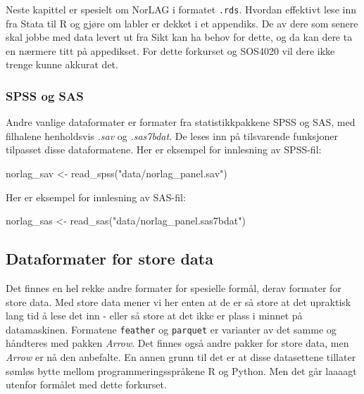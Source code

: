 \documentclass[
  letterpaper,
  DIV=11,
  numbers=noendperiod]{scrreprt}
\newenvironment{Shaded}{\begin{snugshade}}{\end{snugshade}}
\newcommand{\FunctionTok}[1]{\textcolor[rgb]{0.28,0.35,0.67}{#1}}
\newcommand{\NormalTok}[1]{\textcolor[rgb]{0.00,0.23,0.31}{#1}}
\newcommand{\OtherTok}[1]{\textcolor[rgb]{0.00,0.23,0.31}{#1}}
\newcommand{\StringTok}[1]{\textcolor[rgb]{0.13,0.47,0.30}{#1}}
\theoremstyle{definition}
\theoremstyle{remark}
\begin{document}
Neste kapittel er spesielt om NorLAG i formatet \texttt{.rds}. Hvordan
effektivt lese inn fra Stata til R og gjøre om labler er dekket i et
appendiks. De av dere som senere skal jobbe med data levert ut fra Sikt
kan ha behov for dette, og da kan dere ta en nærmere titt på appedikset.
For dette forkurset og SOS4020 vil dere ikke trenge kunne akkurat det.

\hypertarget{spss-og-sas}{%
\subsubsection{SPSS og SAS}\label{spss-og-sas}}

Andre vanlige dataformater er formater fra statistikkpakkene SPSS og
SAS, med filhalene henholdsvis \emph{.sav} og \emph{.sas7bdat}. De leses
inn på tilsvarende funksjoner tilpasset disse dataformatene. Her er
eksempel for innlesning av SPSS-fil:

\begin{Shaded}
\begin{Highlighting}[]
\NormalTok{norlag\_sav }\OtherTok{\textless{}{-}} \FunctionTok{read\_spss}\NormalTok{(}\StringTok{"data/norlag\_panel.sav"}\NormalTok{)}
\end{Highlighting}
\end{Shaded}

Her er eksempel for innlesning av SAS-fil:

\begin{Shaded}
\begin{Highlighting}[]
\NormalTok{norlag\_sas }\OtherTok{\textless{}{-}} \FunctionTok{read\_sas}\NormalTok{(}\StringTok{"data/norlag\_panel.sas7bdat"}\NormalTok{)}
\end{Highlighting}
\end{Shaded}

\hypertarget{dataformater-for-store-data}{%
\subsection{Dataformater for store
data}\label{dataformater-for-store-data}}

Det finnes en hel rekke andre formater for spesielle formål, derav
formater for store data. Med store data mener vi her enten at de er så
store at det upraktisk lang tid å lese det inn - eller så store at det
ikke er plass i minnet på datamaskinen. Formatene \texttt{feather} og
\texttt{parquet} er varianter av det samme og håndteres med pakken
\emph{Arrow}. Det finnes også andre pakker for store data, men
\emph{Arrow} er nå den anbefalte. En annen grunn til det er at disse
datasettene tillater sømløs bytte mellom programmeringsspråkene R og
Python. Men det går laaaagt utenfor formålet med dette forkurset.
\end{document}

